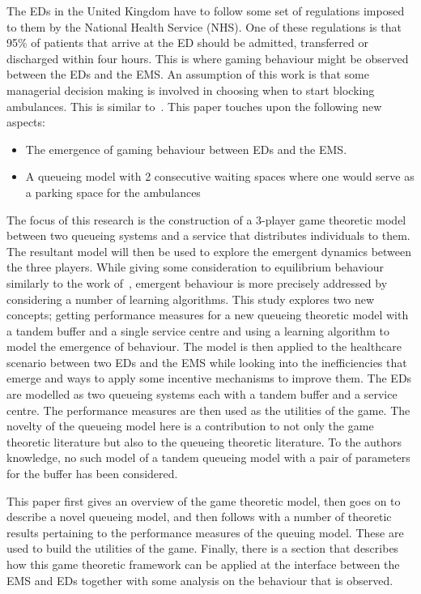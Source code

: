 The EDs in the United Kingdom have to follow some set of regulations imposed to 
them by the National Health Service (NHS).
One of these regulations is that 95\% of patients that arrive at the ED should 
be admitted, transferred or discharged within four hours.
This is where gaming behaviour might be observed between the EDs and the EMS.
An assumption of this work is that some managerial decision making is involved
in choosing when to start blocking ambulances.
This is similar to~\cite{deo2011centralized}.
This paper touches upon the following new aspects:
\begin{itemize}
    \item The emergence of gaming behaviour between EDs and the EMS.
    \item A queueing model with 2 consecutive waiting spaces where one would 
    serve as a parking space for the ambulances
\end{itemize}
The focus of this research is the construction of a 3-player game theoretic 
model between two queueing systems and a service that distributes individuals
to them. 
The resultant model will then be used to explore the emergent dynamics between 
the three players.
While giving some consideration to equilibrium behaviour similarly to the 
work of~\cite{FirmCompetition, FirmCompetition2, deo2011centralized, 
veltman2005equilibrium}, emergent behaviour is more precisely addressed by 
considering a number of learning algorithms.
This study explores two new concepts; getting performance measures for a new
queueing theoretic model with a tandem buffer and a single service centre and 
using a learning algorithm to model the emergence of behaviour.
The model is then applied to the healthcare scenario between two EDs and the 
EMS while looking into the inefficiencies that emerge and ways to apply some 
incentive mechanisms to improve them.
The EDs are modelled as two queueing systems each with a tandem buffer and a 
service centre. 
The performance measures are then used as the utilities of the game.
The novelty of the queueing model here is a contribution to not only the game 
theoretic literature but also to the queueing theoretic literature.
To the authors knowledge, no such model of a tandem queueing model with a pair 
of parameters for the buffer has been considered.

This paper first gives an overview of the game theoretic model, then goes on 
to describe a novel queueing model, and then follows with a number of theoretic 
results pertaining to the performance measures of the queuing model. 
These are used to build the utilities of the game.
Finally, there is a section that describes how this game theoretic framework
can be applied at the interface between the EMS and EDs together with some 
analysis on the behaviour that is observed.
